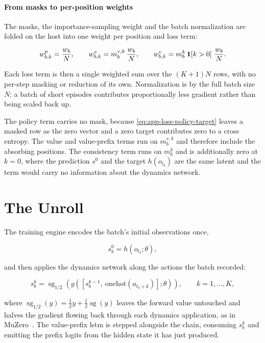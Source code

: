 \paragraph{From masks to per-position weights}
The masks, the importance-sampling weight and the batch normalization are folded on the host into
one weight per position and loss term:

\begin{equation}\label{eq:app-loss-weights}
  w^p_{b,k}=\frac{w_b}{N},
  \qquad
  w^v_{b,k}=m^{v,k}_b\,\frac{w_b}{N},
  \qquad
  w^c_{b,k}=m^{k}_b\,\mathbf{1}\!\left[k>0\right]\,\frac{w_b}{N}.
\end{equation}

Each loss term is then a single weighted sum over the $(K+1)N$ rows, with no per-step masking or
reduction of its own.
Normalization is by the full batch size $N$: a batch of short episodes
contributes proportionally less gradient rather than being scaled back up.

The policy term carries no mask, because \cref{eq:app-loss-policy-target} leaves a masked row as
the zero vector and a zero target contributes zero to a cross entropy.
The value and value-prefix terms run on $m^{v,k}_b$ and therefore include the absorbing positions.
The consistency term runs on $m^k_b$ and is additionally zero at $k=0$, where the prediction $s^0$
and the target $h(o_{t_b})$ are the same latent and the term would carry no information about the
dynamics network.

\section{The Unroll}\label{sec:app-loss-unroll}

The training engine encodes the batch's initial observations once,

\begin{equation}\label{eq:app-loss-unroll-root}
  s^0_b=h(o_{t_b};\theta),
\end{equation}

and then applies the dynamics network along the actions the batch recorded:

\begin{equation}\label{eq:app-loss-unroll-step}
  s^k_b=\operatorname{sg}_{1/2}\!\left(g\!\left(\left[s^{k-1}_b,\ \mathrm{onehot}(a_{t_b+k})\right];\theta\right)\right),
  \qquad k=1,\dots,K,
\end{equation}

where $\operatorname{sg}_{1/2}(y)=\tfrac12 y+\tfrac12\operatorname{sg}(y)$ leaves the forward value
untouched and halves the gradient flowing back through each dynamics application, as in
MuZero~\cite{schrittwieser_mastering_2020}.
The value-prefix \gls{lstm} is stepped alongside the chain, consuming $s^k_b$ and emitting the
prefix logits from the hidden state it has just produced.

